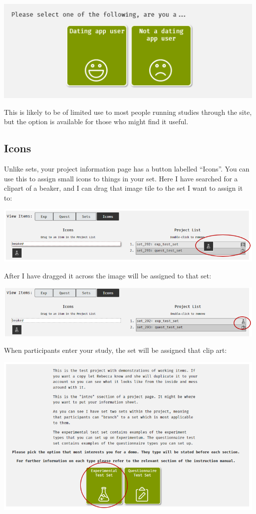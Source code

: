 \documentclass[]{book}
\begin{document}
\includegraphics{images/screenshots/proj_12.png}

This is likely to be of limited use to most people running studies
through the site, but the option is available for those who might find
it useful.

\subsection*{Icons}\label{icons}

Unlike sets, your project information page has a button labelled
``Icons''. You can use this to assign small icons to things in your set.
Here I have searched for a clipart of a beaker, and I can drag that
image tile to the set I want to assign it to:

\includegraphics{images/screenshots/proj_9.png}

After I have dragged it across the image will be assigned to that set:

\includegraphics{images/screenshots/proj_10.png}

When participants enter your study, the set will be assigned that clip
art:

\includegraphics{images/screenshots/proj_11.png}
\end{document}
